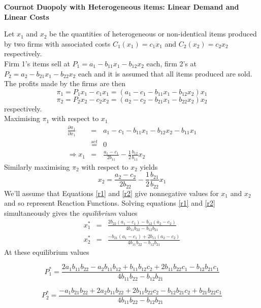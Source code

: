 \documentclass[a4paper,12pt]{article}
\begin{document}
\begin{center}
\textbf{Cournot Duopoly with Heterogeneous items: Linear Demand and Linear Costs %
}
\end{center}
Let $x_1$ and $x_2$ be the quantities of heterogeneous or non-identical items produced by two firms with associated costs $C_1(x_1) = c_1x_1$ and $C_2(x_2)= c_2x_2$ respectively.\\
Firm 1's items sell at $P_1 = a_1 - b_{11}x_1-b_{12}x_2$ each, firm 2's at $P_2 = a_2 - b_{21}x_1-b_{22}x_2$ each and it is assumed that all items produced are sold. \\ The profits made by the firms are then
$$ \pi_1 = P_1 x_1 - c_1 x_1 = \left(a_1-c_1 - b_{11}x_1 - b_{12}x_2\right)x_1$$
$$ \pi_2 = P_2 x_2 - c_2 x_2 =\left(a_2-c_2 - b_{21}x_1 - b_{22}x_2\right)x_2$$
respectively.\\
Maximising $\pi_1$ with respect to $x_1$
\begin{eqnarray}
 \frac{\partial \pi_1} {\partial x_1} &=& a_1-c_1 - b_{11}x_1 - b_{12}x_2 - b_{11}x_1 \nonumber \\
 & \stackrel{set}{=} & 0 \nonumber \\
 \Rightarrow x_1 &=& \frac{a_1-c_1}{2b_{11}} - \frac{1}{2}\frac{b_{12}}{b_{11}} x_2 \label{r1}
 \end{eqnarray}
 Similarly maximising $\pi_2$ with respect to $x_2$ yields
 \begin{equation} x_2 =  \frac{a_2-c_2}{2b_{22}} - \frac{1}{2}\frac{b_{21}}{b_{22}} x_1 \label{r2} \end{equation}
 We'll assume that Equations \ref{r1} and \ref{r2} give nonnegative values for $x_1$ and $x_2$ and so represent Reaction Functions.
 Solving equations \ref{r1} and \ref{r2} simultaneously gives the \textit{equilibrium} values
 \begin{eqnarray*}
   x^*_1 &=& \frac{2b_{22}(a_1-c_1)-b_{12}(a_2-c_2)}{4b_{11}b_{22}-b_{12}b_{21}} \\
   x^*_2 &=& \frac{-b_{21}(a_1-c_1)+2b_{11}(a_2-c_2)}{4b_{11}b_{22}-b_{12}b_{21}}
 \end{eqnarray*}
 At these equilibrium values

$$P^*_1  = \frac{2a_1b_{11} b_{22} - a_2 b_{11} b_{12} + b_{11} b_{12} c_2
  + 2 b_{11} b_{22} c_1 - b_{12} b_{21} c_1}{4 b_{11} b_{22} - b_{12} b_{21}}$$

$$P^*_2  = \frac{-a_1b_{21} b_{22} + 2a_2 b_{11} b_{22} +2 b_{11} b_{22} c_2
  -  b_{12} b_{21} c_2 + b_{21} b_{22} c_1}{4 b_{11} b_{22} - b_{12} b_{21}}$$
\end{document}
